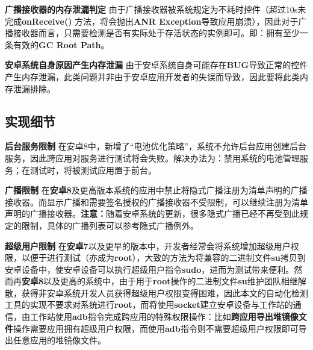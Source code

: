 \textbf{广播接收器的内存泄漏判定 } 由于广播接收器被系统规定为不耗时控件（超过10s未完成\textbf{onReceive()} 方法，将会抛出\textbf{ANR Exception}导致应用崩溃），因此对于广播接收器而言，只需要检测是否有实际处于存活状态的实例即可。即：拥有至少一条有效的\textbf{GC Root Path}。

\textbf{安卓系统自身原因产生内存泄漏 } 由于安卓系统自身可能存在\textbf{BUG}导致正常的控件产生内存泄漏，此类问题并非由于安卓应用开发者的失误而导致，因此要将此类内存泄漏排除。

\subsection{实现细节}

\textbf{后台服务限制 }\cite{android-service-limit} 在安卓8中，新增了“电池优化策略”，系统不允许后台应用创建后台服务，因此跨应用对服务进行测试将会失败。解决办法为：禁用系统的电池管理服务；在测试时，将被测试应用置于前台。

\textbf{广播限制 }\cite{android-receiver-limit} 在\textbf{安卓8}及更高版本系统的应用中禁止将隐式广播注册为清单声明的广播接收器。而显示广播和需要签名授权的广播接收器不受限制，可以继续注册为清单声明的广播接收器。\textbf{注意：}随着安卓系统的更新，很多隐式广播已经不再受到此规定的限制，具体的广播列表可以参考隐式广播例外\cite{android-receiver-limit-exception}。

\textbf{超级用户限制 } 在\textbf{安卓7}以及更早的版本中，开发者经常会将系统增加超级用户权限，以便于进行测试（亦成为\textbf{root}），大致的方法为将兼容的二进制文件\textbf{su}拷贝到安卓设备中，使安卓设备可以执行超级用户指令\textbf{sudo}，进而为测试带来便利。然而再\textbf{安卓8}以及更高的系统中，由于用于\textbf{root}操作的二进制文件\textbf{su}维护团队相继解散，获得非安卓系统开发人员获得超级用户权限变得困难，因此本文的自动化检测工具的实现不要求对系统进行\textbf{root}，而将使用\textbf{socket}建立安卓设备与工作站的通信，由工作站使用\textbf{adb}指令完成跨应用的特殊权限操作：比如\textbf{跨应用导出堆镜像文件}操作需要应用拥有超级用户权限，而使用\textbf{adb}指令则不需要超级用户权限即可导出任意应用的堆镜像文件。